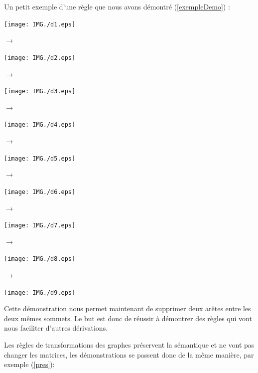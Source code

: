 \documentclass[a4paper,oneside]{book}
\begin{document}
Un petit exemple d'une règle que nous avons démontré (\ref{exempleDemo}) :

\begin{center}
\begin{minipage}[c]{0.2\textwidth}
\flushright\texttt{[image: IMG./d1.eps]}
\end{minipage}
\Huge{$\longrightarrow$}
\begin{minipage}[c]{0.2\textwidth}
\flushright\texttt{[image: IMG./d2.eps]}
\end{minipage}
\Huge{$\longrightarrow$}
\begin{minipage}[c]{0.2\textwidth}
\flushright\texttt{[image: IMG./d3.eps]}
\end{minipage}
\Huge{$\longrightarrow$}
\\
\begin{minipage}[c]{0.2\textwidth}
\flushright\texttt{[image: IMG./d4.eps]}
\end{minipage}
\Huge{$\longrightarrow$}
\begin{minipage}[c]{0.2\textwidth}
\flushright\texttt{[image: IMG./d5.eps]}
\end{minipage}
\Huge{$\longrightarrow$}
\begin{minipage}[c]{0.2\textwidth}
\flushright\texttt{[image: IMG./d6.eps]}
\end{minipage}
\Huge{$\longrightarrow$}
\\
\begin{minipage}[c]{0.2\textwidth}
\flushright\texttt{[image: IMG./d7.eps]}
\end{minipage}
\hspace{0.7cm}\Huge{$\longrightarrow$}
\begin{minipage}[c]{0.2\textwidth}
\flushright\texttt{[image: IMG./d8.eps]}
\end{minipage}
\hspace{1cm}\Huge{$\longrightarrow$}
\begin{minipage}[c]{0.2\textwidth}
\texttt{[image: IMG./d9.eps]}
\end{minipage}

\label{exempleDemo}
\end{center}

Cette démonstration nous permet maintenant de supprimer deux arêtes entre les deux mêmes sommets. Le but est donc de réussir à démontrer des règles qui vont nous faciliter d'autres dérivations.

Les règles de transformations des graphes préservent la sémantique et ne vont pas changer les matrices, les démonstrations se passent donc de la même manière, par exemple (\ref{pres}):
\end{document}
